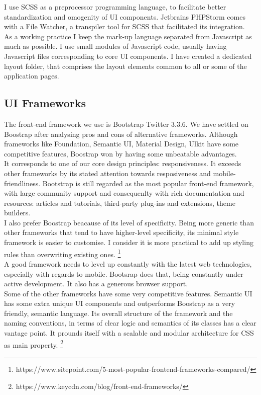 I use SCSS as a preprocessor programming language, to facilitate better standardization and omogenity of UI components. Jetbrains PHPStorm comes with a File Watcher, a transpiler tool for SCSS that facilitated its integration.\\

As a working practice I keep the mark-up language separated from Javascript as much as possible. I use small modules of Javascript code, usually having Javascript files corresponding to core UI components.
I have created a dedicated layout folder, that comprises the layout elements common to all or some of the application pages. 

\subsection{UI Frameworks} 

The front-end framework we use is Bootstrap Twitter 3.3.6. We have settled on Boostrap after analysing pros and cons of alternative frameworks.
Although frameworks like Foundation, Semantic UI, Material Design, Ulkit have some competitive features, Boostrap won by having some unbeatable advantages.\\

It corresponds to one of our core design principles: responsiveness. It exceeds other frameworks by its stated attention towards resposiveness and mobile-friendliness.
Bootstrap is still regarded as the most popular front-end framework, with large community support and consequenlty with rich documentation and resources: articles and tutorials, third-party plug-ins and extensions, theme builders.\\

I also prefer Boostrap beacause of its level of specificity. Being more generic than other frameworks that tend to have higher-level specificity, its minimal style framework is easier to customise. I consider it is more practical to add up styling rules than overwriting existing ones. 
\footnote{https://www.sitepoint.com/5-most-popular-frontend-frameworks-compared/}\\

A good framework needs to level up constantly with the latest web technologies, especially with regards to mobile. Bootsrap does that, being constantly under active development. It also has a generous browser support.\\	

Some of the other frameworks have some very competitive features. Semantic UI has some extra unique UI components and outperforms Boostrap as a very friendly, semantic language. Its overall structure of the framework and the naming conventions, in terms of clear logic and semantics of its classes has a clear vantage point. It prounds itself with a scalable and modular architecture for CSS as main property. \footnote{https://www.keycdn.com/blog/front-end-frameworks/}\\

